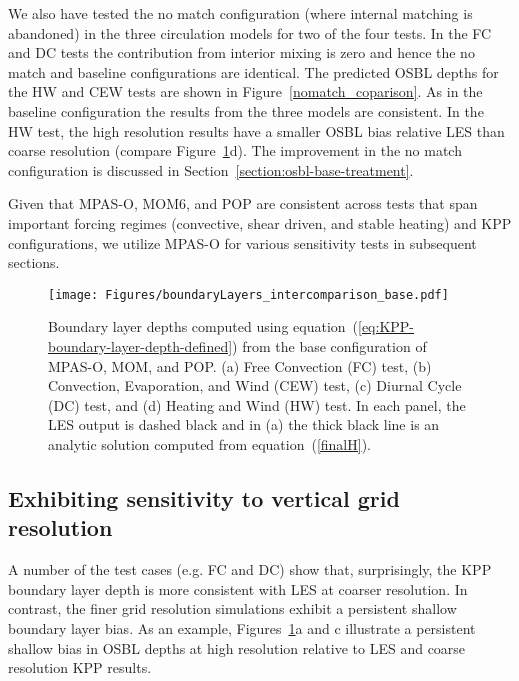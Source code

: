 \documentclass[preprint,12pt,authoryear]{agujournal}
\begin{document}
We also have tested the no match configuration (where internal matching is abandoned) in the three circulation models for two of the four tests.  In the FC and DC tests the contribution from interior mixing is zero and hence the no match and baseline configurations are identical.  The predicted OSBL depths for the HW and CEW tests are shown in Figure~\ref{nomatch_coparison}.  As in the baseline configuration the results from the three models are consistent.  In the HW test, the high resolution results have a smaller OSBL bias relative LES than coarse resolution (compare Figure~\ref{matchconfig_compare}d).  The improvement in the no match configuration is discussed in Section~\ref{section:osbl-base-treatment}.

Given that MPAS-O, MOM6, and POP are consistent across tests that span important forcing regimes (convective, shear driven, and stable heating) and KPP configurations, we utilize MPAS-O for various sensitivity tests in subsequent sections.

\begin{figure}
\centering\texttt{[image: Figures/boundaryLayers\_intercomparison\_base.pdf]}
\caption{Boundary layer depths computed using equation~(\ref{eq:KPP-boundary-layer-depth-defined}) from the base configuration of MPAS-O, MOM, and POP. (a) Free Convection (FC) test, (b) Convection, Evaporation, and Wind (CEW) test, (c) Diurnal Cycle (DC) test, and (d) Heating and Wind (HW) test.  In each panel, the LES output is dashed black and in (a) the thick black line is an analytic solution computed from equation~(\ref{finalH}).}
\label{matchconfig_compare}
\end{figure}

\subsection{Exhibiting sensitivity to vertical grid resolution}
\label{section:vertical-resolution}

A number of the test cases (e.g. FC and DC) show that, surprisingly, the KPP boundary layer depth is more consistent with LES at coarser resolution.  In contrast, the finer grid resolution simulations exhibit a persistent shallow boundary layer bias. As an example, Figures~\ref{matchconfig_compare}a and c illustrate a persistent shallow bias in OSBL depths at high resolution relative to LES and coarse resolution KPP results.  
\end{document}
